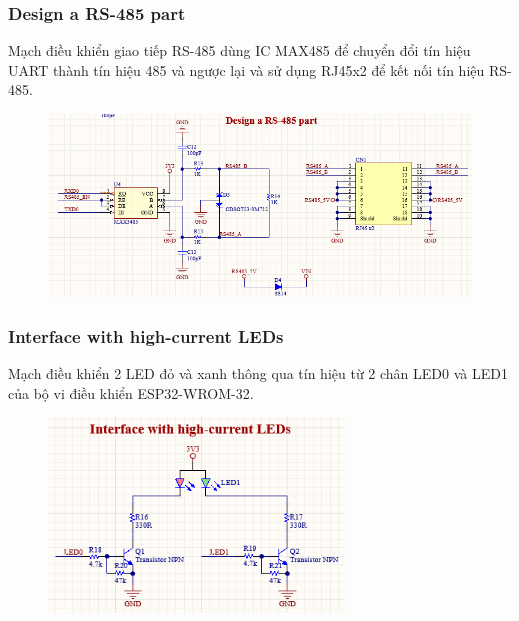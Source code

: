 \subsubsection{Design a RS-485 part}
\label{subsec: Design a RS-485 part}
Mạch điều khiển giao tiếp RS-485 dùng IC MAX485 để chuyển đổi tín hiệu UART thành tín hiệu 485 và ngược lại và sử dụng RJ45x2 để kết nối tín hiệu RS-485.
\begin{figure}[!htbp]
    \centering
    \includegraphics[width=\textwidth]{graphics/section3/f5.PNG}
\end{figure}
\FloatBarrier

\subsubsection{Interface with high-current LEDs}
\label{subsec: Interface with high-current LEDs}

Mạch điều khiển 2 LED đỏ và xanh thông qua tín hiệu từ 2 chân LED0 và LED1 của bộ vi điều khiển ESP32-WROM-32.
\begin{figure}[!htbp]
    \centering
    \includegraphics[width=0.7\textwidth]{graphics/section3/f6.PNG}
\end{figure}
\FloatBarrier

